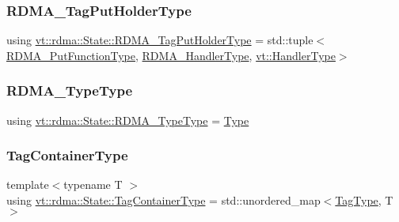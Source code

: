 \mbox{\label{structvt_1_1rdma_1_1_state_a8a25176f05bb2570889d6b41089ac1ca}} 
\subsubsection{\texorpdfstring{R\+D\+M\+A\+\_\+\+Tag\+Put\+Holder\+Type}{RDMA\_TagPutHolderType}}
{\footnotesize\ttfamily using \hyperlink{structvt_1_1rdma_1_1_state_a8a25176f05bb2570889d6b41089ac1ca}{vt\+::rdma\+::\+State\+::\+R\+D\+M\+A\+\_\+\+Tag\+Put\+Holder\+Type} =  std\+::tuple$<$\hyperlink{structvt_1_1rdma_1_1_state_aa43a5d043fe01086818e9c5c364341d4}{R\+D\+M\+A\+\_\+\+Put\+Function\+Type}, \hyperlink{namespacevt_a9530efb893c0f3846e8ac5f0507e0f49}{R\+D\+M\+A\+\_\+\+Handler\+Type}, \hyperlink{namespacevt_af64846b57dfcaf104da3ef6967917573}{vt\+::\+Handler\+Type}$>$}

\mbox{\label{structvt_1_1rdma_1_1_state_a69c1d74d76a8e46f428b657eb1c763c1}} 
\subsubsection{\texorpdfstring{R\+D\+M\+A\+\_\+\+Type\+Type}{RDMA\_TypeType}}
{\footnotesize\ttfamily using \hyperlink{namespacevt_1_1rdma_ac848e1d9da43db6294bd06f83e5d3946}{vt\+::rdma\+::\+State\+::\+R\+D\+M\+A\+\_\+\+Type\+Type} =  \hyperlink{namespacevt_1_1rdma_ac848e1d9da43db6294bd06f83e5d3946}{Type}}

\mbox{\label{structvt_1_1rdma_1_1_state_ad84b403803cc575ef54d0d0ac74017e9}} 
\subsubsection{\texorpdfstring{Tag\+Container\+Type}{TagContainerType}}
{\footnotesize\ttfamily template$<$typename T $>$ \\
using \hyperlink{structvt_1_1rdma_1_1_state_ad84b403803cc575ef54d0d0ac74017e9}{vt\+::rdma\+::\+State\+::\+Tag\+Container\+Type} =  std\+::unordered\+\_\+map$<$\hyperlink{namespacevt_a84ab281dae04a52a4b243d6bf62d0e52}{Tag\+Type}, T$>$}



